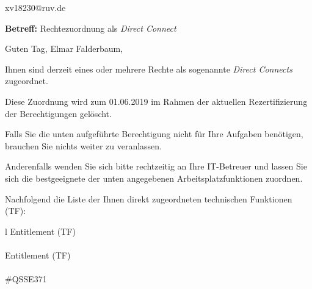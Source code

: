 \documentclass[a4paper,landscape,12pt]{letter}
\begin{document}
\begin{letter}{xv18230@ruv.de\hfill \break}
\begin{normalsize}
	\opening{\textbf{Betreff:} Rechtezuordnung als \emph{Direct Connect}}
	\begin{normalsize} \hfill
	\end{normalsize}

	\begin{normalsize}
		Guten Tag, 
	Elmar Falderbaum, \hfill \break
	\end{normalsize}
	\end{normalsize}
	
\begin{normalsize}
	Ihnen sind derzeit eines oder mehrere Rechte als sogenannte \emph{Direct Connects} zugeordnet.
	
	Diese Zuordnung wird zum 01.06.2019 im Rahmen der aktuellen Rezertifizierung der Berechtigungen gelöscht.
	
	Falls Sie die unten aufgeführte Berechtigung nicht für Ihre Aufgaben benötigen, 
	brauchen Sie nichts weiter zu veranlassen.
	
	Anderenfalls wenden Sie sich bitte rechtzeitig an Ihre IT-Betreuer 
	und lassen Sie sich die bestgeeignete der unten angegebenen Arbeitsplatzfunktionen zuordnen.
	\end{normalsize}
	
\begin{normalsize}
	Nachfolgend die Liste der Ihnen direkt zugeordneten technischen Funktionen (TF):

	\begin{longtable}{l}
		Entitlement (TF) \\ \hline
		\endfirsthead
		\\\hline
		Entitlement (TF) \\ \hline
		\endhead %
		\multicolumn{1}{r@{}}{Fortsetzung \ldots}\\
		\endfoot
		\hline
		\endlastfoot
	\#QSSE371\\
	\end{longtable}
	\end{normalsize}
	

\end{letter}
\end{document}
